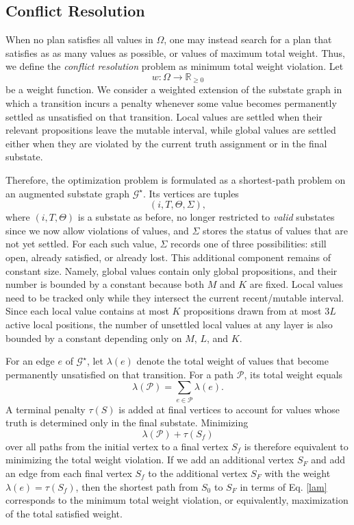 \documentclass[]{jair}
\begin{document}
\subsection{Conflict Resolution}\label{softopt}

When no plan satisfies all values in $\Omega$, one may instead search for a plan that satisfies as
as many values as possible, or values of maximum total weight. Thus, we define
the {\it conflict resolution} problem as minimum total weight violation. Let
\[
w:\Omega \to \mathbb{R}_{\geq 0}
\]
be a weight function. We consider a weighted extension of the substate graph in which a
transition incurs a penalty whenever some value becomes permanently settled as unsatisfied on that
transition. Local values are settled when their relevant propositions leave the mutable interval,
while global values are settled either when they are violated by the current truth assignment or in the final substate.

Therefore, the optimization problem is formulated as a shortest-path problem
on an augmented substate graph $\mathcal{G}^{\star}$. Its vertices are tuples
\[
(i,T,\Theta,\Sigma),
\]
where $(i,T,\Theta)$ is a substate as before, no longer restricted to {\it valid} substates since we now allow violations of values, and $\Sigma$ stores the status of values that are not yet settled. For each such value, $\Sigma$ records one of three possibilities: still open, already satisfied, or already lost. This additional component remains of constant size. Namely, global values contain only global propositions, and their number is bounded by a constant because both $M$ and $K$ are fixed. Local values need to be tracked only while they intersect the current recent/mutable interval. Since each local value contains at most $K$ propositions drawn from at most $3L$ active local positions, the number of unsettled local values at any layer is also bounded by a constant depending only on $M$, $L$, and $K$.

For an edge $e$ of $\mathcal{G}^{\star}$, let $\lambda(e)$ denote the total weight of values that become
permanently unsatisfied on that transition. For a path $\mathcal{P}$, its total weight equals
\begin{equation}\label{lam}
\lambda(\mathcal{P})=\sum_{e\in \mathcal{P}} \lambda(e).
\end{equation}
A terminal penalty $\tau(S)$ is added at final vertices to account for values whose truth
is determined only in the final substate. Minimizing
\[
\lambda(\mathcal{P})+\tau(S_f)
\]
over all paths from the initial vertex to a final vertex $S_f$ is therefore equivalent to
minimizing the total weight violation. If we add an additional vertex $S_F$ and add an edge from each final vertex $S_f$ to
the additional vertex $S_F$ with the weight $\lambda(e)=\tau(S_f)$, then the shortest path from $S_0$ to $S_F$ in terms of
Eq. \eqref{lam} corresponds to the minimum total weight violation, or equivalently, maximization of the total satisfied weight.
\end{document}
